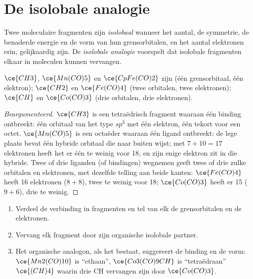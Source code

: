 \section{De isolobale analogie}

\begin{definition}\label{def:b3:organometallic-bonding:isolobal}
Twee moleculaire fragmenten zijn
\emph{isolobaal} wanneer het aantal, de
symmetrie, de benaderde energie en de vorm van hun grensorbitalen, en het
aantal elektronen erin, gelijkaardig zijn. De \emph{isolobale
analogie} voorspelt dat isolobale fragmenten
elkaar in moleculen kunnen vervangen.
\end{definition}

\begin{proposition}\label{prop:b3:organometallic-bonding:isolobal}
$\ce{CH3}$, $\ce{Mn(CO)5}$ en $\ce{CpFe(CO)2}$ zijn  (één grensorbitaal, één elektron);
$\ce{CH2}$ en $\ce{Fe(CO)4}$ (twee orbitalen, twee elektronen); $\ce{CH}$ en $\ce{Co(CO)3}$ (drie orbitalen,
drie elektronen).
\end{proposition}

\begin{proof}[Beargumenteerd]
$\ce{CH3}$ is een tetraëdrisch fragment waaraan één binding ontbreekt: één orbitaal van het type $sp^3$ met één
elektron, één tekort voor een octet. $\ce{Mn(CO)5}$ is een octaëder waaraan één ligand ontbreekt: de
lege plaats bevat één hybride orbitaal die naar buiten wijst; met $7 + 10 = 17$ elektronen heeft het er
één te weinig voor 18, en zijn enige elektron zit in die hybride. Twee
of drie liganden (of bindingen) wegnemen geeft twee of drie zulke
orbitalen en elektronen, met dezelfde telling aan beide kanten: $\ce{Fe(CO)4}$ heeft 16 elektronen ($8 + 8$), twee te weinig voor 18;
$\ce{Co(CO)3}$ heeft er 15 ($9 + 6$), drie te weinig.
\end{proof}

\begin{method}\label{met:b3:organometallic-bonding:isolobal}
\begin{enumerate}
  \item Verdeel de verbinding in fragmenten en tel van elk de
        grensorbitalen en de elektronen.
  \item Vervang elk fragment door zijn organische isolobale partner.
  \item Het organische analogon, als het bestaat, suggereert de binding en de vorm:
        $\ce{Mn2(CO)10}$ is ``ethaan'', $\ce{Co3(CO)9CH}$ is ``tetraëdraan'' $\ce{(CH)4}$ waarin drie CH
        vervangen zijn door $\ce{Co(CO)3}$.
\end{enumerate}
\end{method}

